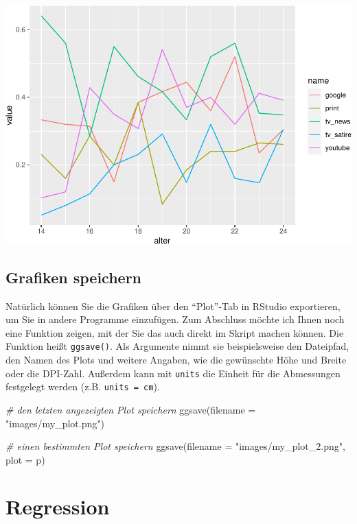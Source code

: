 \documentclass[
]{book}
\newenvironment{Shaded}{\begin{snugshade}}{\end{snugshade}}
\newcommand{\AttributeTok}[1]{\textcolor[rgb]{0.77,0.63,0.00}{#1}}
\newcommand{\CommentTok}[1]{\textcolor[rgb]{0.56,0.35,0.01}{\textit{#1}}}
\newcommand{\FunctionTok}[1]{\textcolor[rgb]{0.00,0.00,0.00}{#1}}
\newcommand{\NormalTok}[1]{#1}
\newcommand{\StringTok}[1]{\textcolor[rgb]{0.31,0.60,0.02}{#1}}
\begin{document}
\includegraphics{r_book_files/figure-latex/unnamed-chunk-83-1.pdf}

\hypertarget{grafiken-speichern}{%
\section{Grafiken speichern}\label{grafiken-speichern}}

Natürlich können Sie die Grafiken über den ``Plot''-Tab in RStudio exportieren, um Sie in andere Programme einzufügen. Zum Abschluss möchte ich Ihnen noch eine Funktion zeigen, mit der Sie das auch direkt im Skript machen können. Die Funktion heißt \texttt{ggsave()}. Als Argumente nimmt sie beispielsweise den Dateipfad, den Namen des Plots und weitere Angaben, wie die gewünschte Höhe und Breite oder die DPI-Zahl. Außerdem kann mit \texttt{units} die Einheit für die Abmessungen festgelegt werden (z.B. \texttt{units\ =\ cm}).

\begin{Shaded}
\begin{Highlighting}[]
\CommentTok{\# den letzten angezeigten Plot speichern}
\FunctionTok{ggsave}\NormalTok{(}\AttributeTok{filename =} \StringTok{"images/my\_plot.png"}\NormalTok{)}

\CommentTok{\# einen bestimmten Plot speichern}
\FunctionTok{ggsave}\NormalTok{(}\AttributeTok{filename =} \StringTok{"images/my\_plot\_2.png"}\NormalTok{,}
       \AttributeTok{plot =}\NormalTok{ p)}
\end{Highlighting}
\end{Shaded}

\hypertarget{regression}{%
\chapter{Regression}\label{regression}}
\end{document}
